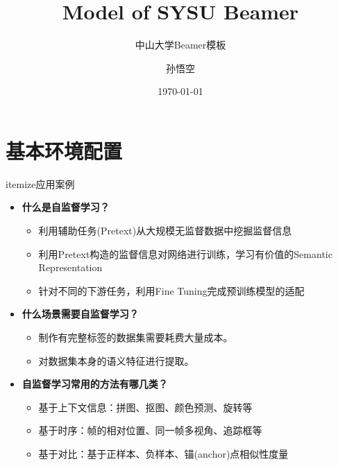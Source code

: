 \documentclass[UTF-8,fontset = none]{ctexbeamer}
\author{孙悟空}
\title{Model of SYSU Beamer}
\subtitle{中山大学Beamer模板}
\institute{中山大学计算机学院}
\date{\today}
\begin{document}
\begin{frame}
    \titlepage
    \begin{figure}[htpb]
        \begin{center}
        \end{center}
    \end{figure}
\end{frame}

\begin{frame}
    \tableofcontents[sectionstyle=show,subsectionstyle=show/shaded/hide,subsubsectionstyle=show/shaded/hide]
\end{frame}


\section{基本环境配置}

\begin{frame}{itemize应用案例}
    \begin{itemize}
    \item \bfseries{什么是自监督学习？} 
        \begin{itemize} 
            \item 利用辅助任务(Pretext)从大规模无监督数据中挖掘监督信息
            \item 利用Pretext构造的监督信息对网络进行训练，学习有价值的Semantic Representation
            \item 针对不同的下游任务，利用Fine Tuning完成预训练模型的适配
        \end{itemize}
    \item \bfseries{什么场景需要自监督学习？}
        \begin{itemize}
            \item 制作有完整标签的数据集需要耗费大量成本。
            \item 对数据集本身的语义特征进行提取。
        \end{itemize}
    \item \bfseries{自监督学习常用的方法有哪几类？}
        \begin{itemize}
            \item 基于上下文信息：拼图、抠图、颜色预测、旋转等
            \item 基于时序：帧的相对位置、同一帧多视角、追踪框等
            \item 基于对比：基于正样本、负样本、锚(anchor)点相似性度量
        \end{itemize}
    \end{itemize}
\end{frame}
\end{document}
